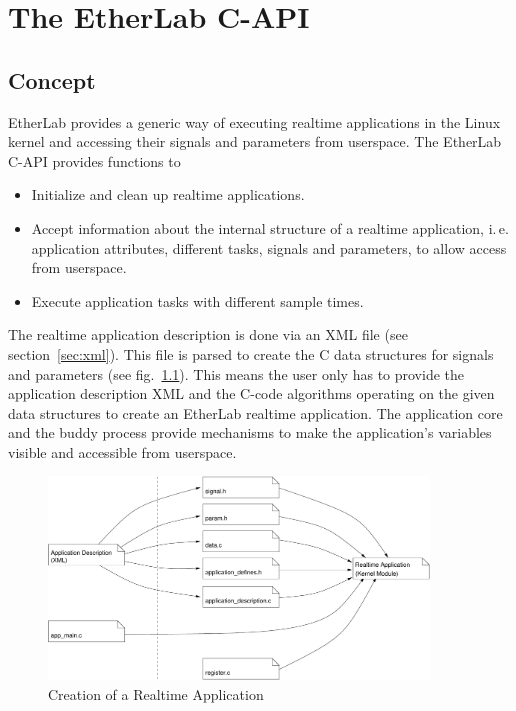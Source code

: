 
\chapter{The EtherLab C-API}
\label{sec:api}


\section{Concept}
\label{sec:api-concept}

EtherLab provides a generic way of executing realtime applications in the
Linux kernel and accessing their signals and parameters from userspace. The
EtherLab C-API provides functions to

\begin{itemize}

\item Initialize and clean up realtime applications.

\item Accept information about the internal structure of a realtime
application, i.\,e.\,application attributes, different tasks, signals and
parameters, to allow access from userspace.

\item Execute application tasks with different sample times.

\end{itemize}

The realtime application description is done via an XML file (see
section~\ref{sec:xml}). This file is parsed to create the C data structures
for signals and parameters (see fig.~\ref{fig:c-api}). This means the user
only has to provide the application description XML and the C-code algorithms
operating on the given data structures to create an EtherLab realtime
application. The application core and the buddy process provide mechanisms to
make the application's variables visible and accessible from userspace.

\begin{figure}[H]
  \begin{center}
    \includegraphics[width=0.9\textwidth]{images/c-api}
    \caption{Creation of a Realtime Application}
    \label{fig:c-api}
  \end{center}
\end{figure}


